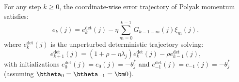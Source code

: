\begin{proposition}
\label{prop:pol_impulse_response}
For any step $k \ge 0$, the coordinate-wise error trajectory of Polyak momentum satisfies:
\begin{equation} \label{eq:pol_impulse_response}
    e_k(j)
    =
    e_k^{\mathrm{det}}(j)
    -
    \eta\sum_{m=0}^{k-1}G_{k-1-m}(j)\xi_m(j),
\end{equation}
where $e_k^{\mathrm{det}}(j)$ is the unperturbed deterministic trajectory solving:
\[
    e_{k+1}^{\mathrm{det}}(j)
    =
    (1+\rho-\eta\lambda_j)e_k^{\mathrm{det}}(j)
    -
    \rho e_{k-1}^{\mathrm{det}}(j),
\]
with initializations $e_0^{\mathrm{det}}(j) = e_0(j) = -\theta_j^*$ and $e_{-1}^{\mathrm{det}}(j) = e_{-1}(j) = -\theta_j^*$ (assuming $\btheta_0=\btheta_{-1}=\bm0$).
\end{proposition}


